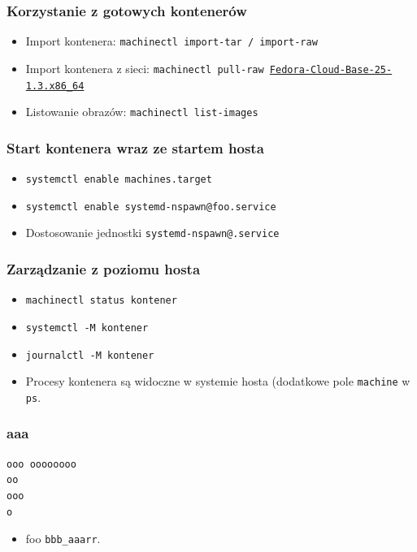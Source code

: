 \documentclass[dvipsnames,table]{beamer}
\begin{document}
\begin{frame}
\frametitle{Korzystanie z gotowych kontenerów}
\begin{itemize}
	\item Import kontenera: {\tt machinectl import-tar / import-raw}
	\item Import kontenera z sieci: {\tt machinectl pull-raw \href{https://dl.fedoraproject.org/pub/fedora/linux/releases/25/CloudImages/x86\_64/images/Fedora-Cloud-Base-25-1.3.x86\_64.raw.xz}{Fedora-Cloud-Base-25-1.3.x86\_64}}
	\item Listowanie obrazów: {\tt machinectl list-images}
\end{itemize}
\end{frame}

\begin{frame}
\frametitle{Start kontenera wraz ze startem hosta}
\begin{itemize}
	\item {\tt systemctl enable machines.target}
	\item {\tt systemctl enable systemd-nspawn@foo.service}
	\item Dostosowanie jednostki {\tt systemd-nspawn@.service}
\end{itemize}
\end{frame}

\begin{frame}
\frametitle{Zarządzanie z poziomu hosta}
\begin{itemize}
	\item {\tt machinectl status kontener}
	\item {\tt systemctl -M kontener}
	\item {\tt journalctl -M kontener}
	\item Procesy kontenera są widoczne w systemie hosta (dodatkowe pole {\tt machine} w {\tt ps}.
\end{itemize}
\end{frame}

\begin{frame}[fragile]
\frametitle{aaa}
\scriptsize
\begin{verbatim}
ooo oooooooo
oo
ooo
o
\end{verbatim}
\normalsize
\begin{itemize}
	\item foo {\tt bbb\_aaarr}.
\end{itemize}
\end{frame}
\end{document}
